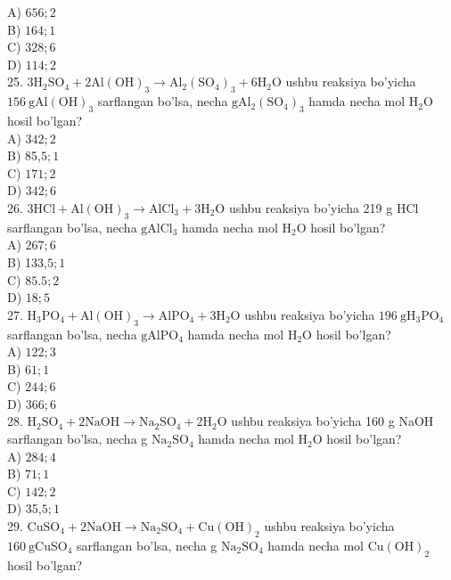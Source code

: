 A) $656 ; 2$\\
B) $164 ; 1$\\
C) $328 ; 6$\\
D) $114 ; 2$\\
25. $3 \mathrm{H}_{2} \mathrm{SO}_{4}+2 \mathrm{Al}(\mathrm{OH})_{3} \rightarrow \mathrm{Al}_{2}\left(\mathrm{SO}_{4}\right)_{3}+6 \mathrm{H}_{2} \mathrm{O}$ ushbu reaksiya bo'yicha $156 \mathrm{~g} \mathrm{Al}(\mathrm{OH})_{3}$ sarflangan bo'lsa, necha $\mathrm{g} \mathrm{Al}_{2}\left(\mathrm{SO}_{4}\right)_{3}$ hamda necha mol $\mathrm{H}_{2} \mathrm{O}$ hosil bo'lgan?\\
A) $342 ; 2$\\
B) 85,$5 ; 1$\\
C) $171 ; 2$\\
D) $342 ; 6$\\
26. $3 \mathrm{HCl}+\mathrm{Al}(\mathrm{OH})_{3} \rightarrow \mathrm{AlCl}_{3}+3 \mathrm{H}_{2} \mathrm{O}$ ushbu reaksiya bo'yicha 219 g HCl sarflangan bo'lsa, necha $\mathrm{g} \mathrm{AlCl}_{3}$ hamda necha mol $\mathrm{H}_{2} \mathrm{O}$ hosil bo'lgan?\\
A) $267 ; 6$\\
B) 133,$5 ; 1$\\
C) $85.5 ; 2$\\
D) $18 ; 5$\\
27. $\mathrm{H}_{3} \mathrm{PO}_{4}+\mathrm{Al}(\mathrm{OH})_{3} \rightarrow \mathrm{AlPO}_{4}+3 \mathrm{H}_{2} \mathrm{O}$ ushbu reaksiya bo'yicha $196 \mathrm{~g} \mathrm{H}_{3} \mathrm{PO}_{4}$ sarflangan bo'lsa, necha $\mathrm{g} \mathrm{AlPO}_{4}$ hamda necha mol $\mathrm{H}_{2} \mathrm{O}$ hosil bo'lgan?\\
A) $122 ; 3$\\
B) $61 ; 1$\\
C) $244 ; 6$\\
D) $366 ; 6$\\
28. $\mathrm{H}_{2} \mathrm{SO}_{4}+2 \mathrm{NaOH} \rightarrow \mathrm{Na}_{2} \mathrm{SO}_{4}+2 \mathrm{H}_{2} \mathrm{O}$ ushbu reaksiya bo'yicha 160 g NaOH sarflangan bo'lsa, necha g $\mathrm{Na}_{2} \mathrm{SO}_{4}$ hamda necha mol $\mathrm{H}_{2} \mathrm{O}$ hosil bo'lgan?\\
A) $284 ; 4$\\
B) $71 ; 1$\\
C) $142 ; 2$\\
D) 35,$5 ; 1$\\
29. $\mathrm{CuSO}_{4}+2 \mathrm{NaOH} \rightarrow \mathrm{Na}_{2} \mathrm{SO}_{4}+\mathrm{Cu}(\mathrm{OH})_{2}$ ushbu reaksiya bo'yicha $160 \mathrm{~g} \mathrm{CuSO}_{4}$ sarflangan bo'lsa, necha g $\mathrm{Na}_{2} \mathrm{SO}_{4}$ hamda necha mol $\mathrm{Cu}(\mathrm{OH})_{2}$ hosil bo'lgan?\\
